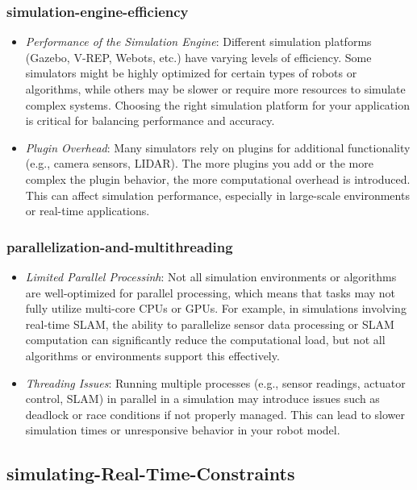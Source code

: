 \documentclass[../../main]{subfiles}
\begin{document}
    \subsubsection{simulation-engine-efficiency}
    \begin{itemize}
    \item
      \emph{Performance of the Simulation Engine}: Different simulation
      platforms (Gazebo, V-REP, Webots, etc.) have varying levels of
      efficiency. Some simulators might be highly optimized for certain
      types of robots or algorithms, while others may be slower or require
      more resources to simulate complex systems. Choosing the right
      simulation platform for your application is critical for balancing
      performance and accuracy.
    \item
      \emph{Plugin Overhead}: Many simulators rely on plugins for
      additional functionality (e.g., camera sensors, LIDAR). The more
      plugins you add or the more complex the plugin behavior, the more
      computational overhead is introduced. This can affect simulation
      performance, especially in large-scale environments or real-time
      applications.
    \end{itemize}
    
    \subsubsection{parallelization-and-multithreading}
    \begin{itemize}
    \item
      \emph{Limited Parallel Processinh}: Not all simulation environments
      or algorithms are well-optimized for parallel processing, which means
      that tasks may not fully utilize multi-core CPUs or GPUs. For example,
      in simulations involving real-time SLAM, the ability to parallelize
      sensor data processing or SLAM computation can significantly reduce
      the computational load, but not all algorithms or environments support
      this effectively.
    \item
      \emph{Threading Issues}: Running multiple processes (e.g., sensor
      readings, actuator control, SLAM) in parallel in a simulation may
      introduce issues such as deadlock or race conditions if not properly
      managed. This can lead to slower simulation times or unresponsive
      behavior in your robot model.
    \end{itemize}
    
    \subsection{simulating-Real-Time-Constraints}
    
\end{document}
